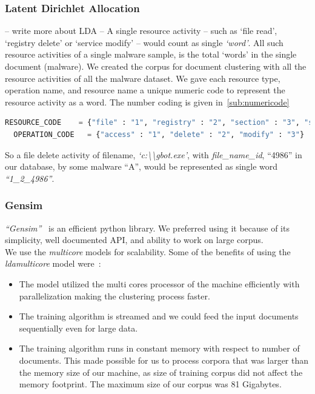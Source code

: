 \subsubsection{Latent Dirichlet Allocation}
\label{ssub:Latent Dirichlet Allocation}
-- write more about LDA --
A single resource activity -- such as `file read', `registry delete' or `service modify' -- would count as single \emph{`word'}.
All such resource activities of a single malware sample, is the total `words' in the single document (malware).
We created the corpus for document clustering with all the resource activities of all the malware dataset.
We gave each resource type, operation name, and resource name a unique numeric code to represent the resource activity as a word.
The number coding is given in~\autoref{sub:numericode}
\begin{lstlisting}[language=python,caption={Numeric codes given to resource and operation},label={lbl:numericode}]
  RESOURCE_CODE    = {"file" : "1", "registry" : "2", "section" : "3", "service" : "4", "driver" : "5", "sync" : "6", "process" : "7", "job" : "8"}
  OPERATION_CODE   = {"access" : "1", "delete" : "2", "modify" : "3"}
\end{lstlisting}
So a file delete activity of filename, \textit{`c:\textbackslash\textbackslash{}gbot.exe'}, with \textit{file\_name\_id}, ``4986'' in our database, by some malware ``A'', would be represented as single word \emph{``1\_2\_4986''}.
\subsubsection{Gensim}
\label{ssub:Gensim}
\emph{``Gensim''}~\cite[]{gensim} is an efficient python library.
We preferred using it because of its simplicity, well documented API, and ability to work on large corpus.\\
We use the \emph{multicore}\cite[]{ldamulticore}  models for scalability.
Some of the benefits of using the \emph{ldamulticore} model were~\cite[]{ldamulticore}:
\begin{itemize}
\item The model utilized the multi cores processor of the machine efficiently with parallelization making the clustering process faster.
\item The training algorithm is streamed and we could feed the input documents sequentially even for large data.
\item The training algorithm runs in constant memory with respect to number of documents.
This made possible for us to process corpora that was larger than the memory size of our machine, as size of training corpus did not affect the memory footprint.
The maximum size of our corpus was 81 Gigabytes.

\end{itemize}
